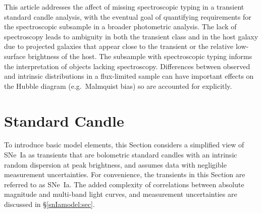 \documentclass[preprint,3p]{elsarticle}
\begin{document}
This article addresses the affect of missing spectroscopic typing in
a transient standard candle analysis, with the eventual goal of quantifying
requirements for the spectroscopic subsample in a broader photometric analysis.
The lack of spectroscopy leads to ambiguity in both the transient class and
in the host galaxy due to projected galaxies that appear close to the transient or
the relative low-surface brightness of the host.  The subsample with
spectroscopic typing informs the interpretation of objects lacking spectroscopy.
Differences between observed and
intrinsic distributions in a flux-limited sample can have important effects on the Hubble
diagram  (e.g.\ Malmquist bias) so are accounted for explicitly.

\section{Standard Candle}
\label{toy:sec}
To introduce basic model elements, this Section considers a
simplified view of SNe~Ia
as transients that are bolometric standard candles with an intrinsic random
dispersion
at peak brightness, and assumes data with negligible measurement uncertainties.
For convenience,
the transients
in this Section are  referred to as SNe~Ia.
The added complexity of correlations between absolute magnitude
and multi-band light curves, and measurement uncertainties
are discussed in
\S\ref{snIamodel:sec}. 
\end{document}
